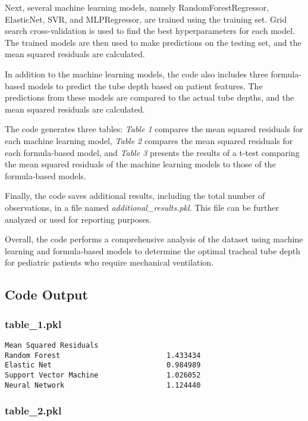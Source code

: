 \documentclass[11pt]{article}
\begin{document}
Next, several machine learning models, namely RandomForestRegressor, ElasticNet, SVR, and MLPRegressor, are trained using the training set. Grid search cross-validation is used to find the best hyperparameters for each model. The trained models are then used to make predictions on the testing set, and the mean squared residuals are calculated.

In addition to the machine learning models, the code also includes three formula-based models to predict the tube depth based on patient features. The predictions from these models are compared to the actual tube depths, and the mean squared residuals are calculated.

The code generates three tables: \textit{Table 1} compares the mean squared residuals for each machine learning model, \textit{Table 2} compares the mean squared residuals for each formula-based model, and \textit{Table 3} presents the results of a t-test comparing the mean squared residuals of the machine learning models to those of the formula-based models.

Finally, the code saves additional results, including the total number of observations, in a file named \textit{additional\_results.pkl}. This file can be further analyzed or used for reporting purposes.

Overall, the code performs a comprehensive analysis of the dataset using machine learning and formula-based models to determine the optimal tracheal tube depth for pediatric patients who require mechanical ventilation.

\subsection{Code Output}

\subsubsection*{table\_1.pkl}

\begin{Verbatim}[tabsize=4]
                        Mean Squared Residuals
Random Forest                         1.433434
Elastic Net                           0.984989
Support Vector Machine                1.026052
Neural Network                        1.124440
\end{Verbatim}

\subsubsection*{table\_2.pkl}
\end{document}
